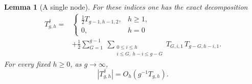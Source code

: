 \documentclass[a4paper,10pt]{article}
\numberwithin{equation}{section}
\theoremstyle{paperplain}
\newtheorem{lmm}[thm]{Lemma}
\theoremstyle{paperremark}
\theoremstyle{paperplain}
\begin{document}
\begin{lmm}[A single node]\label{lmm:s08:one-node}
For these indices one has the exact decomposition
\begin{equation}\label{eq:s08:one-node}
 \begin{aligned}
 T_{g,h}^{\delta}
 ={}&
 \begin{cases}
  \tfrac12 T_{g-1,h-1,2},&h\geq1,\\
  0,&h=0
 \end{cases}\\
 &+\frac12\sum_{G=1}^{g-1}
   \ \sum_{\substack{0\leq i\leq h\\ i\leq G,\ h-i\leq g-G}}
                    T_{G,i,1}\,T_{g-G,h-i,1}.
 \end{aligned}
\end{equation}
For every fixed $h\geq0$, as $g\to\infty$,
\begin{equation}\label{eq:s08:node-bound}
 |T_{g,h}^{\delta}|=O_h(g^{-1}T_{g,h}).
\end{equation}
\end{lmm}
\end{document}
